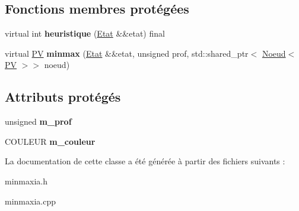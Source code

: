 \subsection*{Fonctions membres protégées}
\begin{DoxyCompactItemize}
\item 
virtual int {\bfseries heuristique} (\hyperlink{structEtat}{Etat} \&\&etat) final\hypertarget{classMinMaxIA_a3261d2cb9a7105d930a0e67722f4289f}{}\label{classMinMaxIA_a3261d2cb9a7105d930a0e67722f4289f}

\item 
virtual \hyperlink{structIA_1_1PV}{PV} {\bfseries minmax} (\hyperlink{structEtat}{Etat} \&\&etat, unsigned prof, std\+::shared\+\_\+ptr$<$ \hyperlink{classNoeud}{Noeud}$<$ \hyperlink{structIA_1_1PV}{PV} $>$$>$ noeud)\hypertarget{classMinMaxIA_a15caae3b6117d717bb6c72dd97acc7c6}{}\label{classMinMaxIA_a15caae3b6117d717bb6c72dd97acc7c6}

\end{DoxyCompactItemize}
\subsection*{Attributs protégés}
\begin{DoxyCompactItemize}
\item 
unsigned {\bfseries m\+\_\+prof}\hypertarget{classMinMaxIA_aab16a043c48ab6b300cdabf8d67c32ec}{}\label{classMinMaxIA_aab16a043c48ab6b300cdabf8d67c32ec}

\item 
C\+O\+U\+L\+E\+UR {\bfseries m\+\_\+couleur}\hypertarget{classMinMaxIA_a9dd148bfadb7fd84d7392ece6669d841}{}\label{classMinMaxIA_a9dd148bfadb7fd84d7392ece6669d841}

\end{DoxyCompactItemize}


La documentation de cette classe a été générée à partir des fichiers suivants \+:\begin{DoxyCompactItemize}
\item 
minmaxia.\+h\item 
minmaxia.\+cpp\end{DoxyCompactItemize}
